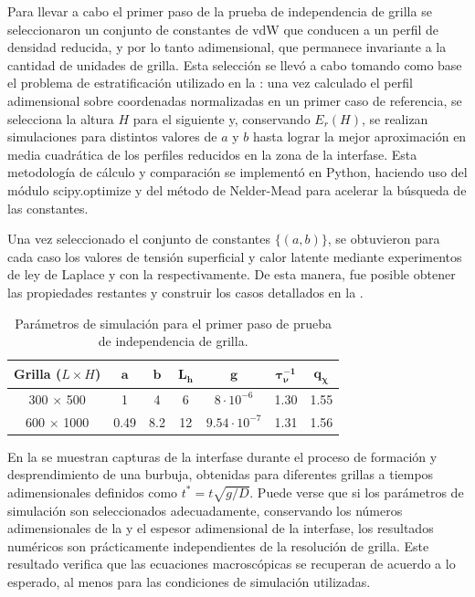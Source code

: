 Para llevar a cabo el primer paso de la prueba de independencia de grilla se seleccionaron un conjunto de constantes de vdW que conducen a un perfil de densidad reducida, y por lo tanto adimensional, que permanece invariante a la cantidad de unidades de grilla. Esta selecci\'on se llev\'o a cabo tomando como base el problema de estratificaci\'on utilizado en la : una vez calculado el perfil adimensional sobre coordenadas normalizadas en un primer caso de referencia, se selecciona la altura $H$ para el siguiente y, conservando $E_r(H)$, se realizan simulaciones para distintos valores de $a$ y $b$ hasta lograr la mejor aproximaci\'on en media cuadr\'atica de los perfiles reducidos en la zona de la interfase. Esta metodolog\'ia  de c\'alculo y comparaci\'on se implement\'o en Python, haciendo uso del m\'odulo scipy.optimize y del m\'etodo de Nelder-Mead para acelerar la b\'usqueda de las constantes.

Una vez seleccionado el conjunto de constantes $\{(a,b)\}$, se obtuvieron para cada caso los valores de tensi\'on superficial y calor latente mediante experimentos de ley de Laplace y con la  respectivamente. De esta manera, fue posible obtener las propiedades restantes y construir los casos detallados en la .
\begin{table}[ht]
	\centering
    \begin{tabular}{c c c c c c c}
	    \toprule
        \bf Grilla ($L\times H$) & $\bm{a}$ & $\bm{b}$ & $\bm{L_h}$ & $\bm{g}$ & $\bm{\tau_{\nu}^{-1}}$ & $\bm{q_{\chi}}$ \\
        \midrule
		300 $\times$ 500   & 1 & 4 & 6 & $8\cdot 10^{-6}$ & 1.30 & 1.55 \\
		600 $\times$ 1000  & 0.49 & 8.2 & 12 & $9.54\cdot 10^{-7}$ & 1.31 & 1.56 \\		
        \bottomrule
	\end{tabular}
	\caption{Par\'ametros de simulaci\'on para el primer paso de prueba de independencia de grilla.}
	\label{tab:gridindep_step1}
\end{table}  

En la  se muestran capturas de la interfase durante el proceso de formaci\'on y desprendimiento de una burbuja, obtenidas para diferentes grillas a tiempos adimensionales definidos como $t^* = t \sqrt{g/D}$. Puede verse que si los par\'ametros de simulaci\'on son seleccionados adecuadamente, conservando los n\'umeros adimensionales de la  y el espesor adimensional de la interfase, los resultados num\'ericos son pr\'acticamente independientes de la resoluci\'on de grilla. Este resultado verifica que las ecuaciones macrosc\'opicas se recuperan de acuerdo a lo esperado, al menos para las condiciones de simulaci\'on utilizadas.

